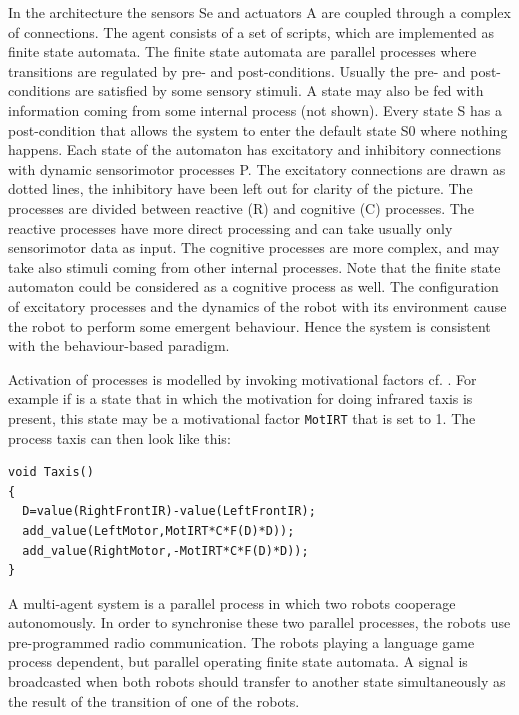 In the architecture the sensors Se and actuators A are coupled through a complex of connections. The agent consists of a set of scripts, which are implemented as finite state automata. The finite state automata are parallel processes where transitions are regulated by pre- and post-conditions. Usually the pre- and post-conditions are satisfied by some sensory stimuli. A state may also be fed with information coming from some internal process (not shown). Every state S has a post-condition that allows the system to enter the default state S0 where nothing happens. Each state of the automaton has excitatory and inhibitory connections with dynamic sensorimotor processes P. The excitatory connections are drawn as dotted lines, the inhibitory have been left out for clarity of the picture. The processes are divided between reactive (R) and cognitive (C) processes. The reactive processes have more direct processing and can take usually only sensorimotor data as input. The cognitive processes are more complex, and may take also stimuli coming from other internal processes. Note that the finite state automaton could be considered as a cognitive process as well. The configuration of excitatory processes and the dynamics of the robot with its environment cause the robot to perform some emergent behaviour. Hence the system is consistent with the behaviour-based paradigm.

Activation of processes is modelled by invoking motivational factors cf. \citep{steels:1996d,jaeger:1997}. For example if is a state that in which the motivation for doing infrared taxis is present, this state may be a motivational factor \texttt{MotIRT} that is set to 1. The process taxis can then look like this:

{\footnotesize\begin{verbatim}
void Taxis()
{
  D=value(RightFrontIR)-value(LeftFrontIR);
  add_value(LeftMotor,MotIRT*C*F(D)*D));
  add_value(RightMotor,-MotIRT*C*F(D)*D));
}
\end{verbatim}}


A multi-agent system is a parallel process in which two robots cooperage autonomously. In order to synchronise these two parallel processes, the robots use pre-programmed radio communication. The robots playing a language game process dependent, but parallel operating finite state automata. A signal is broadcasted when both robots should transfer to another state simultaneously as the result of the transition of one of the robots.


